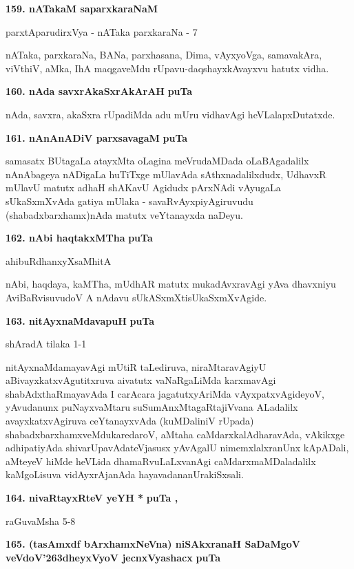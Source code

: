 \medskip
\noindent
\textbf{159. nATakaM saparxkaraNaM}

\hfill{parxtAparudirxVya - nATaka parxkaraNa - 7}

\smallskip
nATaka, parxkaraNa, BANa, parxhasana, Dima, vAyxyoVga, samavakAra, viVthiV, aMka, IhA maqga\-veMdu \-rUpavu-daqshayxkAvayxvu hatutx vidha.

\medskip
\noindent
\textbf{160. nAda savxrAkaSxrAkArAH} \hfill{\bf puTa \pageref{149}}

\smallskip
nAda, savxra, akaSxra rUpadiMda adu mUru vidhavAgi heVLalapxDutatxde.


\medskip
\noindent
\textbf{161. nAnAnADiV parxsavagaM} \hfill{\bf puTa \pageref{155}}

\smallskip
samasatx BUtagaLa atayxMta oLagina meVrudaMDada oLaBAgadalilx nAnAbageya nADigaLa huTiTxge mUla\-vAda sAthxnadalilxdudx, UdhavxR mUlavU matutx adhaH shAKavU Agidudx pArxNAdi vAyugaLa sUkaSxmXvAda gatiya mUlaka - savaRvAyxpiyAgiruvudu (shabadxbarxhamx)nAda matutx veYtanayxda naDeyu.

\eject

\noindent
\textbf{162. nAbi haqtakxMTha} \hfill{\bf puTa \pageref{151}}

\hfill{ahibuRdhanxyXsaMhitA}

\smallskip
nAbi, haqdaya, kaMTha, mUdhAR matutx mukadAvxravAgi yAva dhavxniyu AviBaRvisuvudoV A nAdavu sUkASxmXtisUkaSxmXvAgide. 

\medskip
\noindent
\textbf{163. nitAyxnaMdavapuH} \hfill{\bf puTa \pageref{165}}

\hfill{shAradA tilaka 1-1}

\smallskip
nitAyxnaMdamayavAgi mUtiR taLediruva, niraMtaravAgiyU aBivayxkatx\-vAgu\-titxruva aivatutx vaNaR\-gaLiMda karxmavAgi shabAdxthaRmayavAda I carAcara jagatutx\break yAriMda vAyxpatxvAgideyoV, yAvu\-danunx puNayxvaMtaru suSumAnxMtagaRta\break \hbox{jiVvana} ALadalilx avayxkatxvAgiruva ceYtanayxvAda (kuMDaliniV rUpada) shabadxbarxhamxveMdu\break karedaroV, aMtaha caMdarxkalAdharavAda, vAkikxge adhipatiyAda shivarUpavAda\break teVjasusx yAvAgalU nimemxlalxranUnx kApADali, aMteyeV hiMde heVLida dhamaR\-vuLaLxvanAgi caMdarxmaMDaladalilx kaMgoLisuva vidAyxrAjanAda hayavadananU\break rakiSxsali.

\medskip
\noindent
\textbf{164. nivaRtayxRteV yeYH *} \hfill{\bf puTa \pageref{56}, \pageref{57}}

\hfill{raGuvaMsha 5-8}

\medskip
\noindent
\textbf{165. (tasAmxdf bArxhamxNeVna) niSAkxranaH SaDaMgoV veVdoV\char'263dheyxVyoV jecnxVyashacx} \hfill{\bf puTa \pageref{42}}

